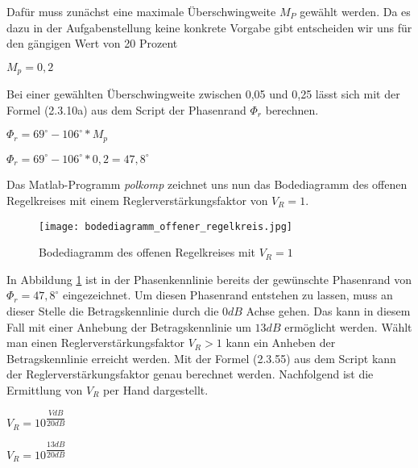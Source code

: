 Dafür muss zunächst eine maximale Überschwingweite $M_{P}$ gewählt werden. Da es dazu in der Aufgabenstellung keine konkrete Vorgabe gibt entscheiden wir uns für den gängigen Wert von 20 Prozent

\begin{center}
$ M_{p} = 0,2 $
\end{center}

Bei einer gewählten Überschwingweite zwischen 0,05 und 0,25 lässt sich mit der Formel (2.3.10a) aus dem Script \cite{EIRTscript} der Phasenrand $\Phi_{r}$ berechnen.

\begin{center}
$\Phi_{r}=69^\circ-106^\circ*M_{p}$
\end{center}

\begin{center}
$\Phi_{r}=69^\circ-106^\circ*0,2=47,8^\circ$
\end{center}

\newpage

Das Matlab-Programm \textit{polkomp} zeichnet uns nun das Bodediagramm des offenen Regelkreises mit einem Reglerverstärkungsfaktor von $V_{R}=1$. 

\begin{figure}[h]
	\begin{center}
		\texttt{[image: bodediagramm\_offener\_regelkreis.jpg]}
		\caption{Bodediagramm des offenen Regelkreises mit $V_{R}=1$}
       \label{bode}
	\end{center} 
\end{figure}

In Abbildung \ref{bode} ist in der Phasenkennlinie bereits der gewünschte Phasenrand von $\Phi_{r}=47,8^\circ$ eingezeichnet. Um diesen Phasenrand entstehen zu lassen, muss an dieser Stelle die Betragskennlinie durch die $0 dB$ Achse gehen. Das kann in diesem Fall mit einer Anhebung der Betragskennlinie um $13dB$ ermöglicht werden. Wählt man einen Reglerverstärkungsfaktor $V_{R}>1$ kann ein Anheben der Betragskennlinie erreicht werden. Mit der Formel (2.3.55) aus dem Script \cite{EIRTscript} kann der Reglerverstärkungsfaktor genau berechnet werden. Nachfolgend ist die Ermittlung von $V_{R}$ per Hand dargestellt.

\begin{center}
$V_{R}=10^{\dfrac{VdB}{20dB}}$
\end{center}

\begin{center}
$V_{R}=10^{\dfrac{13dB}{20dB}}$
\end{center}

